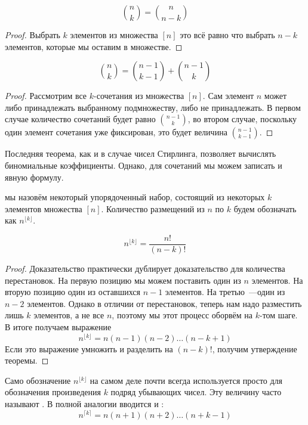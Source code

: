 \begin{thm}
$${n \choose k} = {n \choose n-k}$$
\end{thm}
\begin{proof}
Выбрать $k$ элементов из множества $[n]$ это всё равно что выбрать $n-k$ элементов, которые мы оставим в множестве.
\end{proof}

\begin{thm}
$${n \choose k} = {n-1 \choose k-1} + {n - 1 \choose k}$$
\end{thm}

\begin{proof}
Рассмотрим все $k$-сочетания из множества $[n]$. Сам элемент $n$ может либо принадлежать выбранному подмножеству, либо не принадлежать. В первом случае количество сочетаний будет равно $n-1\choose k$, во втором случае, поскольку один элемент сочетания уже фиксирован, это будет величина $n-1\choose k - 1$.
\end{proof}

Последняя теорема, как и в случае чисел Стирлинга, позволяет вычислять биномиальные коэффициенты. Однако, для сочетаний мы можем записать и явную формулу.

\begin{definition}
 мы назовём некоторый упорядоченный набор, состоящий из некоторых $k$ элементов множества $[n]$. Количество размещений из $n$ по $k$ будем обозначать как $n^{\lfloor k\rfloor}$.
\end{definition}

\begin{thm}
$$n^{\lfloor k \rfloor} = \frac{n!}{(n-k)!}$$
\end{thm}
\begin{proof}
Доказательство практически дублирует доказательство для количества перестановок. На первую позицию мы можем поставить один из $n$ элементов. На вторую позицию один из оставшихся $n-1$ элементов. На третью~---один из $n-2$ элементов. Однако в отличии от перестановок, теперь нам надо разместить лишь $k$ элементов, а не все $n$, поэтому мы этот процесс оборвём на $k$-том шаге. В итоге получаем выражение
$$n^{\lfloor k \rfloor} = n (n-1)  (n-2) \ldots (n-k+1)$$
Если это выражение умножить и разделить на $(n-k)!$, получим утверждение теоремы.
\end{proof}

Само обозначение $n^{\lfloor k \rfloor}$ на самом деле почти всегда используется просто для обозначения произведения $k$ подряд убывающих чисел. Эту величину часто называют . В полной аналогии вводится и :
$$n^{\lceil k \rceil} = n(n+1)(n+2)\ldots(n+k-1)$$

